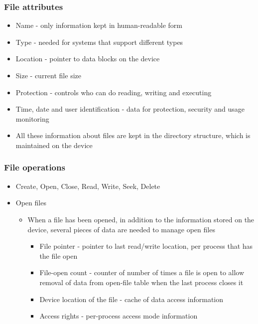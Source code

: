 \documentclass[CJKutf8,dvipsnames,table]{beamer}
\begin{document}
\begin{CJK*}{UTF8}{song}
  \begin{frame}
    \frametitle{File attributes} \pause
    \begin{itemize}
    \item Name \pause - only information kept in human-readable form \pause
    \item Type \pause - needed for systems that support different types \pause
    \item Location \pause - pointer to data blocks on the device \pause
    \item Size \pause - current file size \pause
    \item Protection \pause - controls who can do reading, writing and executing \pause
    \item Time, date and user identification \pause - data for protection, security and usage monitoring \pause
    \item All these information about files are kept in the directory structure, which is maintained on the device
    \end{itemize}
  \end{frame}

  \begin{frame}
    \frametitle{File operations} \pause
    \begin{itemize}
    \item Create, Open, Close, Read, Write, Seek, Delete \pause
    \item Open files \pause
      \begin{itemize}
      \item When a file has been opened, in addition to the information stored on the device, several pieces of data are needed to manage open files \pause
        \begin{itemize}
        \item File pointer \pause - pointer to last read/write location, per process that has the file open \pause
        \item File-open count \pause - counter of number of times a file is open to allow removal of data from open-file table when the last process closes it \pause
        \item Device location of the file \pause - cache of data access information \pause
        \item Access rights \pause - per-process access mode information
        \end{itemize}
      \end{itemize}
    \end{itemize}
  \end{frame}


\end{CJK*}
\end{document}
